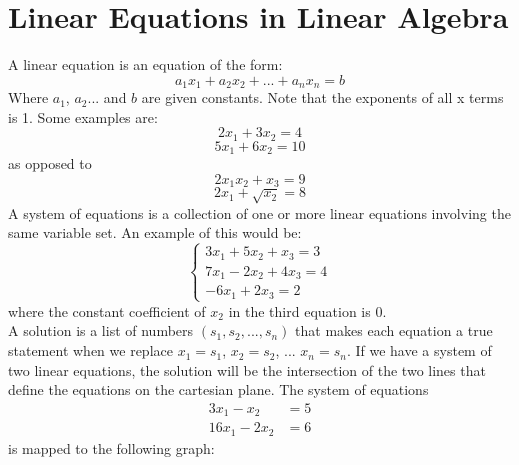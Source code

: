 \documentclass[nobib]{tufte-handout}
\begin{document}
\section{Linear Equations in Linear Algebra}
A linear equation is an equation of the form:
\begin{equation*}
    a_1x_1+a_2x_2+...+a_nx_n=b
\end{equation*}
Where $a_1$, $a_2$... and $b$ are given constants.
Note that the exponents of all x terms is 1.
Some examples are:
\begin{equation*}
    2x_1+3x_2=4
\end{equation*}
\begin{equation*}
    5x_1+6x_2=10
\end{equation*}
as opposed to
\begin{equation*}
    2x_1x_2+x_3=9
\end{equation*}
\begin{equation*}
    2x_1+\sqrt{x_2}=8
\end{equation*}
A system of equations is a collection of one or more linear equations involving the same variable set. 
An example of this would be:
$$ \begin{cases}
3x_1 + 5x_2 + x_3 = 3\\
7x_1 - 2x_2 + 4x_3 = 4\\
-6x_1 + 2x_3 = 2
\end{cases} $$
where the constant coefficient of $x_2$ in the third equation is 0.\\
A solution is a list of numbers $(s_1, s_2, ..., s_n)$ that makes each equation a true statement when we replace $x_1=s_1$, $x_2=s_2$, ... $x_n=s_n$.
If we have a system of two linear equations, the solution will be the intersection of the two lines that define the equations on the cartesian plane. The system of equations
\begin{align*}
    3x_1-x_2 &= 5\\
    16x_1-2x_2 &= 6
\end{align*}
is mapped to the following graph:
\begin{center}
\end{center}
\end{document}

